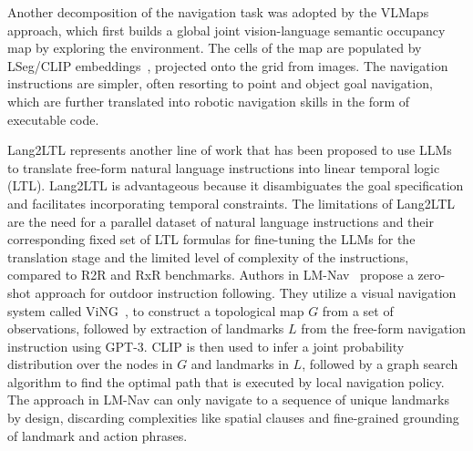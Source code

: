Another decomposition of the navigation task was adopted by the VLMaps~\cite{vlmaps} approach, which first builds a global joint vision-language semantic occupancy map by exploring the environment.
The cells of the map are populated by LSeg/CLIP embeddings~\cite{lseg, clip}, projected onto the grid from images. 
The navigation instructions are simpler, often resorting to point and object goal navigation, which are further translated into robotic navigation skills in the form of executable code. 

\noindent Lang2LTL \cite{liu2023lang2ltl} represents another line of work that has been proposed to use LLMs to translate free-form natural language instructions into linear temporal logic (LTL). Lang2LTL is advantageous because it disambiguates the goal specification and facilitates incorporating temporal constraints. The limitations of Lang2LTL are the need for a parallel dataset of natural language instructions and their corresponding fixed set of LTL formulas for fine-tuning the LLMs for the translation stage and the limited level of complexity of the instructions, compared to R2R \cite{r2r} and RxR \cite{rxr} benchmarks. Authors in LM-Nav~\cite{shah2023lmnav} propose a zero-shot approach for outdoor instruction following. They utilize a visual navigation system called ViNG~\cite{shah2021ving}, to construct a topological map $G$ from a set of observations, followed by extraction of landmarks $L$ from the free-form navigation instruction using GPT-3. 
CLIP is then used to infer a joint probability distribution over the nodes in $G$ and landmarks in $L$, followed by a graph search algorithm to find the optimal path that is executed by local navigation policy. The approach in LM-Nav can only navigate to a sequence of unique landmarks by design, discarding complexities like spatial clauses and fine-grained grounding
of landmark and action phrases. 

